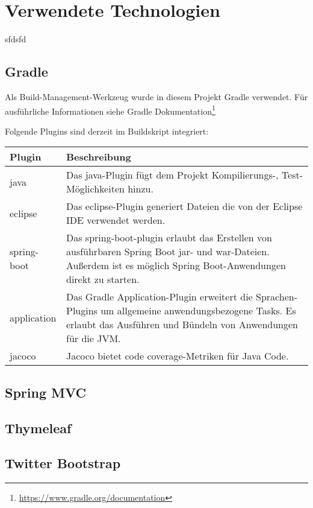 
\thispagestyle{plain}

\chapter{Verwendete Technologien}\label{c_verTech}
sfdsfd

\section{Gradle}\label{s_gradle}
Als Build-Management-Werkzeug wurde in diesem Projekt Gradle verwendet. Für ausführliche Informationen siehe Gradle Dokumentation\footnote{\url{https://www.gradle.org/documentation}}

Folgende Plugins sind derzeit im Buildskript integriert:\\
\begin{tabularx}{\textwidth}{|l|X|} \hline
       \textbf{Plugin}  	& \textbf{Beschreibung} \\ \hline

       java           		& Das java-Plugin fügt dem Projekt Kompilierungs-, Test-Möglichkeiten hinzu.\\\hline
       eclipse           	& Das eclipse-Plugin generiert Dateien die von der Eclipse \ac{IDE} verwendet werden.\\\hline
	   spring-boot          & Das spring-boot-plugin erlaubt das Erstellen von ausführbaren Spring Boot jar- und war-Dateien. Außerdem ist es möglich Spring Boot-Anwendungen direkt zu starten.\\\hline
	   application          & Das Gradle Application-Plugin erweitert die Sprachen-Plugins um allgemeine anwendungsbezogene Tasks. Es erlaubt das Ausführen und Bündeln von Anwendungen für die \ac{JVM}.\\\hline
       jacoco           	& Jacoco bietet code coverage-Metriken für Java Code.\\\hline
        
\end{tabularx}

\section{Spring MVC}\label{s_springmvc}

\section{Thymeleaf}\label{s_thymeleaf}

\section{Twitter Bootstrap}\label{s_bootstrap}